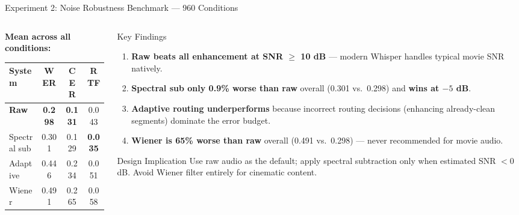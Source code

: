\documentclass[aspectratio=169]{beamer}
\begin{document}
\begin{frame}{Experiment 2: Noise Robustness Benchmark — 960 Conditions}
\begin{columns}[T]
\begin{column}{0.52\textwidth}
      \vspace{0.2cm}
      \textbf{Mean across all conditions:}
      \begin{center}
        \small
        \begin{tabular}{@{}lccc@{}}
          \toprule
          System & WER & CER & RTF \\
          \midrule
          \rowcolor{lightgray}
          \textbf{Raw} & \textbf{0.298} & \textbf{0.131} & 0.043 \\
          Spectral sub & 0.301 & 0.129 & \textbf{0.035} \\
          Adaptive & 0.446 & 0.234 & 0.051 \\
          Wiener & 0.491 & 0.265 & 0.058 \\
          \bottomrule
        \end{tabular}
      \end{center}
    \end{column}
    \begin{column}{0.45\textwidth}
      \begin{block}{Key Findings}
        \begin{enumerate}
          \item \textbf{Raw beats all enhancement at SNR $\geq$ 10 dB} — modern Whisper handles typical movie SNR natively.
          \vspace{0.1cm}
          \item \textbf{Spectral sub only 0.9\% worse than raw} overall (0.301 vs.\ 0.298) and \textbf{wins at $-5$ dB}.
          \vspace{0.1cm}
          \item \textbf{Adaptive routing underperforms} because incorrect routing decisions (enhancing already-clean segments) dominate the error budget.
          \vspace{0.1cm}
          \item \textbf{Wiener is 65\% worse than raw} overall (0.491 vs.\ 0.298) — never recommended for movie audio.
        \end{enumerate}
      \end{block}
      \begin{alertblock}{Design Implication}
        Use raw audio as the default; apply spectral subtraction only when estimated SNR $< 0$ dB. Avoid Wiener filter entirely for cinematic content.
      \end{alertblock}
    \end{column}
  \end{columns}
\end{frame}
\end{document}
